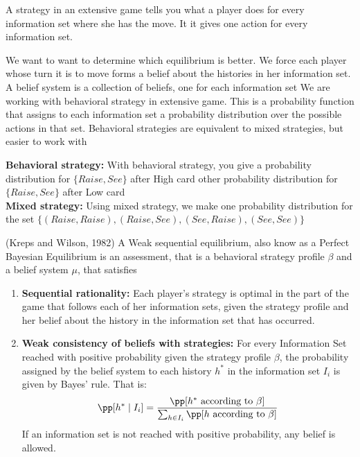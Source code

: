 \begin{definition}[Stategy]
    A strategy in an extensive game tells you what a player does for every information set where she has the move. It it gives one action for every information set.
\end{definition}


\begin{definition}
    We want to want to determine which equilibrium is better. We force each player whose turn it is to move forms a belief about the histories in her
    information set. A belief system is a collection of beliefs, one for each information set
    We are working with behavioral strategy in extensive game. This is a probability function that assigns to each information set a
    probability distribution over the possible actions in that set. Behavioral strategies are equivalent to mixed strategies, but easier to work with
\end{definition}


\begin{example}
    \textbf{Behavioral strategy: } With behavioral strategy, you give a probability distribution for $\{Raise, See\}$ after High card
    other probability distribution for $\{Raise, See\}$ after Low card\\
    \textbf{Mixed strategy: } Using mixed strategy, we make one probability distribution for the set
    $\{(Raise,Raise), (Raise, See), (See, Raise), (See,See)\}$
\end{example}


\begin{definition}(Kreps and Wilson, 1982)
    A Weak sequential equilibrium, also know as a Perfect Bayesian Equilibrium is an assessment, that is a behavioral strategy profile $\beta$ and a belief system $\mu$, that satisfies
    \begin{enumerate}[label=(\roman*)]
        \item \textbf{Sequential rationality: } Each player’s strategy is optimal in the part of the game that follows each of her
              information sets, given the strategy profile and her belief about the history in the
              information set that has occurred.
        \item \textbf{Weak consistency of beliefs with strategies: }
              For every Information Set reached with positive probability given the strategy profile $\beta$,
              the probability assigned by the belief system to each history $h^*$ in the information set $I_i$ is
              given by Bayes’ rule. That is:
              \begin{equation*}
                  \pp[ h^* \mid I_i ] = \frac{\pp[ h^* \text{ according to } \beta ]}{\sum_{h \in I_i}\pp [h \text{ according to } \beta ]}
              \end{equation*}
              If an information set is not reached with positive probability, any belief is allowed.
    \end{enumerate}
\end{definition}


